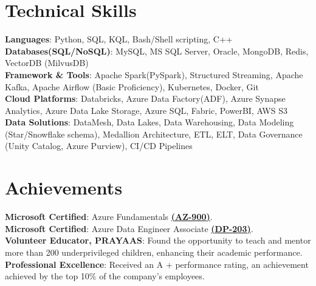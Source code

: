\documentclass[letterpaper,11pt]{article}
\begin{document}
\section{Technical Skills}
 \begin{itemize}[leftmargin=0.15in, label={}]
    \small{\item{
     \textbf{Languages}{: Python, SQL, KQL, Bash/Shell scripting, C++  } \\
     \textbf{Databases(SQL/NoSQL)}{: MySQL, MS SQL Server, Oracle, MongoDB, Redis, VectorDB (MilvusDB)} \\
     \textbf{Framework \& Tools}{: Apache Spark(PySpark), Structured Streaming, Apache Kafka, Apache Airflow (Basic Proficiency), Kubernetes, Docker, Git} \\
     \textbf{Cloud Platforms}{: Databricks, Azure Data Factory(ADF), Azure Synapse Analytics, Azure Data Lake Storage, Azure SQL, Fabric, PowerBI, AWS S3} \\
       \textbf{Data Solutions}{: DataMesh, Data Lakes, Data Warehousing, Data Modeling (Star/Snowflake schema), Medallion Architecture, ETL, ELT, Data Governance (Unity Catalog, Azure Purview),  CI/CD Pipelines}
    }}
 \end{itemize}


\section{Achievements}
\begin{itemize}[leftmargin=0.15in, label={}]
    \small{\item 
    \textbf{Microsoft Certified}{: Azure Fundamentals \href{https://learn.microsoft.com/api/credentials/share/en-us/AshishKanoujia-1422/62087E366EAC30AB?sharingId=DF65B6CF14FEAC80}{\textbf{(AZ-900)}}.} \\
    \textbf{Microsoft Certified}{: Azure Data Engineer Associate \href{https://learn.microsoft.com/api/credentials/share/en-us/AshishKanoujia-1422/6D389D669BB649B4?sharingId=DF65B6CF14FEAC80}{\textbf{(DP-203)}}.}\\
    \textbf{Volunteer Educator, PRAYAAS}{: Found the opportunity to teach and mentor more than 200 underprivileged children, enhancing their academic performance.} \\
    \textbf{Professional Excellence}{: Received an A + performance rating, an achievement achieved by the top 10\% of the company's employees.} }
\end{itemize}


\end{document}
